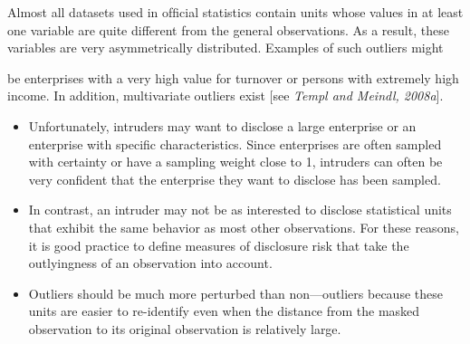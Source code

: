 Almost all datasets used in ofﬁcial statistics contain units whose values in at least
one variable are quite different from the general observations. As a result, these
variables are very asymmetrically distributed. Examples of such outliers might

be enterprises with a very high value for turnover or persons with extremely high
income. In addition, multivariate outliers exist [see \textit{Templ and Meindl, 2008a}].

\begin{itemize}
	\item Unfortunately, intruders may want to disclose a large enterprise or an enterprise
	with speciﬁc characteristics. Since enterprises are often sampled with certainty or
	have a sampling weight close to 1, intruders can often be very conﬁdent that the
	enterprise they want to disclose has been sampled. 
	\item In contrast, an intruder may
	not be as interested to disclose statistical units that exhibit the same behavior as
	most other observations. For these reasons, it is good practice to deﬁne measures
	of disclosure risk that take the outlyingness of an observation into account. 
	\item Outliers should be much more perturbed than
	non—outliers because these units are easier to re-identify even when the distance
	from the masked observation to its original observation is relatively large.
\end{itemize}

